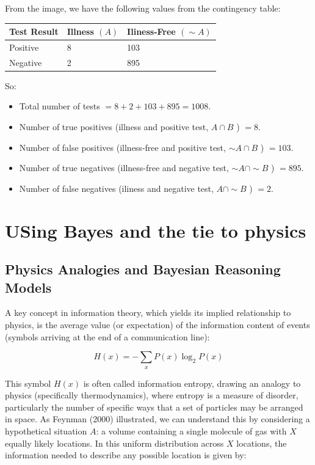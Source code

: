 \documentclass[
  12 pt,
  a4paper,
]{book}
\providecommand{\tightlist}{%
  \setlength{\itemsep}{0pt}\setlength{\parskip}{0pt}}
\numberwithin{equation}{section}
\theoremstyle{plain}      %
\theoremstyle{definition} %
\theoremstyle{remark}     %
\theoremstyle{note}         %
\begin{document}
From the image, we have the following values from the contingency table:

\begin{tabular}{|l|l|l|}
\hline Test Result & Illness $(A)$ & Iliness-Free $(\sim A)$ \\
\hline Positive & 8 & 103 \\
\hline Negative & 2 & 895 \\
\hline
\end{tabular}

So:

\begin{itemize}
\tightlist
\item
  Total number of tests \(=8+2+103+895=1008\).
\item
  Number of true positives (illness and positive test, \(A \cap B\) )
  \(=8\).
\item
  Number of false positives (illness-free and positive test,
  \(\sim A \cap B\) ) \(=103\).
\item
  Number of true negatives (illness-free and negative test,
  \(\sim A \cap \sim B\) ) \(=895\).
\item
  Number of false negatives (iliness and negative test,
  \(A \cap \sim B\) ) \(=2\).
\end{itemize}

\newpage

\hypertarget{using-bayes-and-the-tie-to-physics}{%
\section{USing Bayes and the tie to
physics}\label{using-bayes-and-the-tie-to-physics}}

\hypertarget{physics-analogies-and-bayesian-reasoning-models}{%
\subsection{Physics Analogies and Bayesian Reasoning
Models}\label{physics-analogies-and-bayesian-reasoning-models}}

A key concept in information theory, which yields its implied
relationship to physics, is the average value (or expectation) of the
information content of events (symbols arriving at the end of a
communication line):

\[
H(x)=-\sum_x P(x) \log _2 P(x)
\]

This symbol \(H(x)\) is often called information entropy, drawing an
analogy to physics (specifically thermodynamics), where entropy is a
measure of disorder, particularly the number of specific ways that a set
of particles may be arranged in space. As Feynman (2000) illustrated, we
can understand this by considering a hypothetical situation \(A\): a
volume containing a single molecule of gas with \(X\) equally likely
locations. In this uniform distribution across \(X\) locations, the
information needed to describe any possible location is given by:
\end{document}
